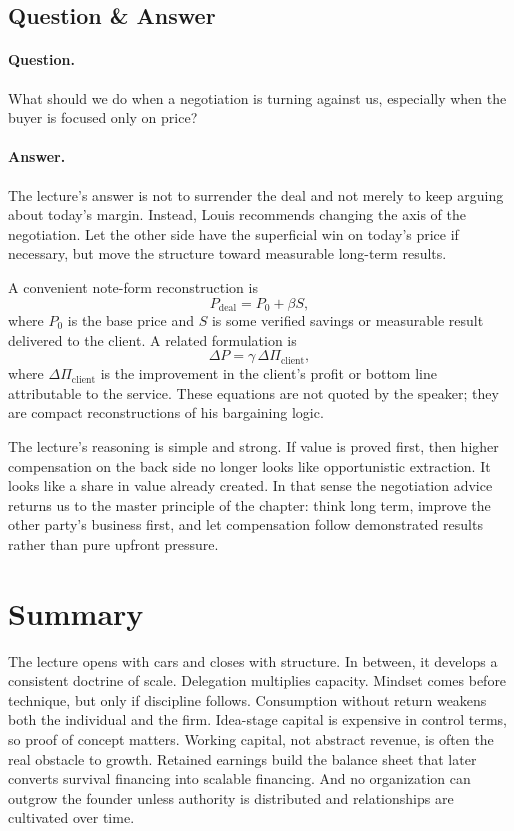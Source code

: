 \subsection{Question \& Answer}

\paragraph{Question.}
What should we do when a negotiation is turning against us, especially when the buyer is focused only on price?

\paragraph{Answer.}
The lecture's answer is not to surrender the deal and not merely to keep arguing about today's margin. Instead, Louis recommends changing the axis of the negotiation. Let the other side have the superficial win on today's price if necessary, but move the structure toward measurable long-term results.

A convenient note-form reconstruction is
\begin{equation}
P_{\mathrm{deal}} = P_0 + \beta S,
\end{equation}
where \(P_0\) is the base price and \(S\) is some verified savings or measurable result delivered to the client. A related formulation is
\begin{equation}
\Delta P = \gamma\,\Delta \Pi_{\mathrm{client}},
\end{equation}
where \(\Delta \Pi_{\mathrm{client}}\) is the improvement in the client's profit or bottom line attributable to the service. These equations are not quoted by the speaker; they are compact reconstructions of his bargaining logic.

The lecture's reasoning is simple and strong. If value is proved first, then higher compensation on the back side no longer looks like opportunistic extraction. It looks like a share in value already created. In that sense the negotiation advice returns us to the master principle of the chapter: think long term, improve the other party's business first, and let compensation follow demonstrated results rather than pure upfront pressure.

\section{Summary}

The lecture opens with cars and closes with structure. In between, it develops a consistent doctrine of scale. Delegation multiplies capacity. Mindset comes before technique, but only if discipline follows. Consumption without return weakens both the individual and the firm. Idea-stage capital is expensive in control terms, so proof of concept matters. Working capital, not abstract revenue, is often the real obstacle to growth. Retained earnings build the balance sheet that later converts survival financing into scalable financing. And no organization can outgrow the founder unless authority is distributed and relationships are cultivated over time.

